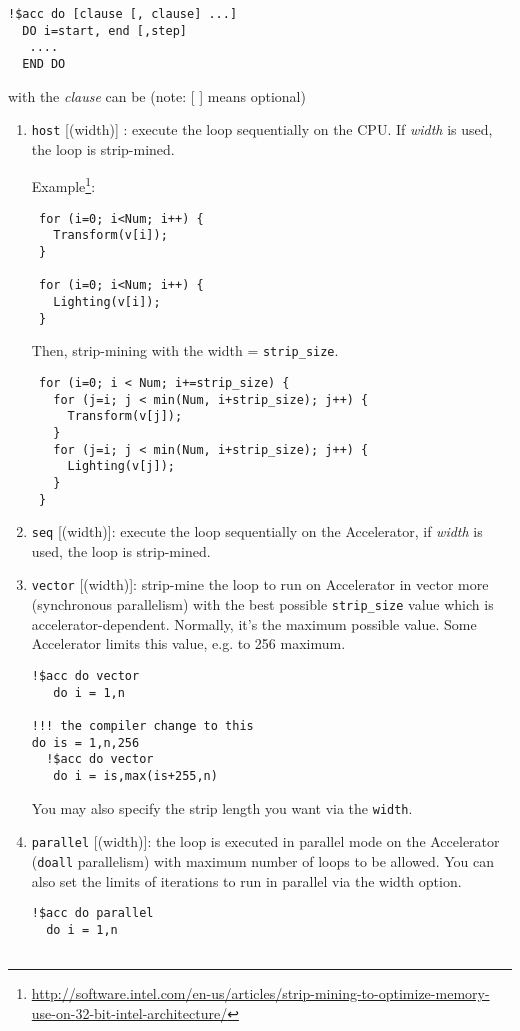 \begin{lstlisting}
!$acc do [clause [, clause] ...]
  DO i=start, end [,step]
   ....
  END DO
\end{lstlisting}
with the {\it clause} can be (note: [ ] means optional)
\begin{enumerate}
\item \verb!host! [(width)] : execute the loop sequentially on the
  CPU. If {\it width} is used, the loop is strip-mined. 

Example\footnote{\url{http://software.intel.com/en-us/articles/strip-mining-to-optimize-memory-use-on-32-bit-intel-architecture/}}:
\begin{lstlisting}
 for (i=0; i<Num; i++) { 
   Transform(v[i]); 
 } 

 for (i=0; i<Num; i++) { 
   Lighting(v[i]); 
 } 
\end{lstlisting}
Then, strip-mining with the width = \verb!strip_size!. 
\begin{lstlisting}
 for (i=0; i < Num; i+=strip_size) { 
   for (j=i; j < min(Num, i+strip_size); j++) { 
     Transform(v[j]); 
   } 
   for (j=i; j < min(Num, i+strip_size); j++) { 
     Lighting(v[j]); 
   } 
 } 
\end{lstlisting}

\item \verb!seq! [(width)]: execute the loop sequentially on the
  Accelerator, if {\it width} is used, the loop is strip-mined. 

\item \verb!vector! [(width)]: strip-mine the loop to run on
  Accelerator in vector more (synchronous parallelism) with the best
  possible \verb!strip_size! value which is
  accelerator-dependent. Normally, it's the maximum possible
  value. Some Accelerator limits this value, e.g. to 256 maximum.
\begin{lstlisting}
!$acc do vector 
   do i = 1,n

!!! the compiler change to this
do is = 1,n,256 
  !$acc do vector 
   do i = is,max(is+255,n)

\end{lstlisting}
  You may also specify the strip length you want via the \verb!width!.

\item \verb!parallel! [(width)]: the loop is executed in parallel mode
  on the Accelerator (\verb!doall! parallelism) with maximum number of
  loops to be allowed. You can also set the limits of iterations to
  run in parallel via the width option.
\begin{lstlisting}
!$acc do parallel 
  do i = 1,n


\end{lstlisting}
\end{enumerate}
